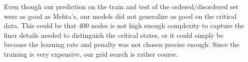 Even though our prediction on the train and test of the ordered/disordered set were as good as Mehta's, our models did not generalize as good on the critical data. This could be that 400 nodes is not high enough complexity to capture the finer details needed to distinguish the critical states, or it could simply be 
because the learning rate and penalty was not chosen precise enough: Since the training is very expensive, our grid search is rather course.